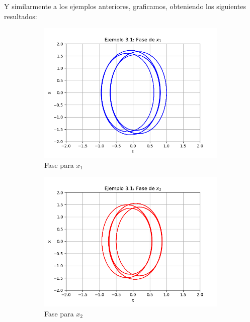 \documentclass[a4paper]{article}
\begin{document}
\begin{center}
\pagebreak

Y similarmente a los ejemplos anteriores, graficamos, obteniendo los siguientes resultados:

\begin{figure}[ht!]
\begin{subfigure}{0.6\textwidth}
  \centering
  \includegraphics[width=\linewidth]{ejemplo_3_1_5.png}
   \caption{Fase para $x_1$}
\end{subfigure}
\begin{subfigure}{0.6\textwidth}
  \centering
  \includegraphics[width=\linewidth]{ejemplo_3_1_6.png}
  \caption{Fase para $x_2$}
\end{subfigure}
\begin{subfigure}{0.6\textwidth}

\end{subfigure}
\end{figure}
\end{center}
\end{document}
